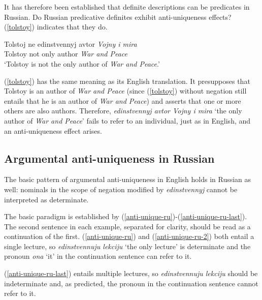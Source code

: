\documentclass{article}
\begin{document}
It has therefore been established that definite descriptions can be predicates in Russian. Do Russian predicative definites exhibit anti-uniqueness effects? (\ref{tolstoy}) indicates that they do.

\begin{exe}
	\ex \label{tolstoy} \gll Tolstoj ne edinstvennyj avtor \textit{Vojny i mira}\\
	Tolstoy not only author \textit{War and Peace}\\
	\glt `Tolstoy is not the only author of \textit{War and Peace}.'
\end{exe}

(\ref{tolstoy}) has the same meaning as its English translation. It presupposes that Tolstoy is an author of \textit{War and Peace} (since (\ref{tolstoy}) without negation still entails that he is an author of \textit{War and Peace}) and asserts that one or more others are also authors. Therefore, \textit{edinstvennyj avtor Vojny i mira} `the only author of \textit{War and Peace}' fails to refer to an individual, just as in English, and an anti-uniqueness effect arises.

\subsection{Argumental anti-uniqueness in Russian}
The basic pattern of argumental anti-uniqueness in English holds in Russian as well: nominals in the scope of negation modified by \textit{edinstvennyj} cannot be interpreted as determinate.

The basic paradigm is established by (\ref{anti-unique-ru})-(\ref{anti-unique-ru-last}). The second sentence in each example, separated for clarity, should be read as a continuation of the first. (\ref{anti-unique-ru}) and (\ref{anti-unique-ru-2}) both entail a single lecture, so \textit{edinstvennuju lekciju} `the only lecture' is determinate and the pronoun \textit{ona} `it' in the continuation sentence can refer to it.

(\ref{anti-unique-ru-last}) entails multiple lectures, so \textit{edinstvennuju lekciju} should be indeterminate and, as predicted, the pronoun in the continuation sentence cannot refer to it.
\end{document}

